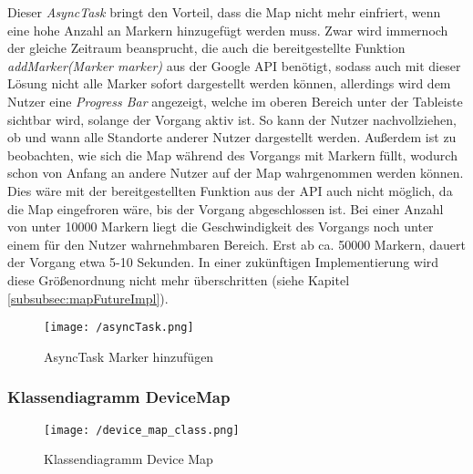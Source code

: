 Dieser \textit{AsyncTask} bringt den Vorteil, dass die Map nicht mehr einfriert, wenn eine hohe Anzahl an Markern hinzugefügt werden muss. Zwar wird immernoch der gleiche Zeitraum beansprucht, die auch die bereitgestellte Funktion \textit{addMarker(Marker marker)} aus der Google API benötigt, sodass auch mit dieser Lösung nicht alle Marker sofort dargestellt werden können, allerdings wird dem Nutzer eine \textit{Progress Bar} angezeigt, welche im oberen Bereich unter der Tableiste sichtbar wird, solange der Vorgang aktiv ist. So kann der Nutzer nachvollziehen, ob und wann alle Standorte anderer Nutzer dargestellt werden. Außerdem ist zu beobachten, wie sich die Map während des Vorgangs mit Markern füllt, wodurch schon von Anfang an andere Nutzer auf der Map wahrgenommen werden können. Dies wäre mit der bereitgestellten Funktion aus der API auch nicht möglich, da die Map eingefroren wäre, bis der Vorgang abgeschlossen ist.
Bei einer Anzahl von unter 10000 Markern liegt die Geschwindigkeit des Vorgangs noch unter einem für den Nutzer wahrnehmbaren Bereich. Erst ab ca. 50000 Markern, dauert der Vorgang etwa 5-10 Sekunden. In einer zukünftigen Implementierung wird diese Größenordnung nicht mehr überschritten (siehe Kapitel \ref{subsubsec:mapFutureImpl}).

\begin{figure}[H]
\centering
\texttt{[image: /asyncTask.png]}
\caption[User Interface: Klassendiagramm Device Map]{AsyncTask Marker hinzufügen}
\label{fig:asyncTask}
\end{figure}

\subsubsection{Klassendiagramm DeviceMap}
\begin{figure}[H]
\centering
\texttt{[image: /device\_map\_class.png]}
\caption[User Interface: Klassendiagramm Device Map]{Klassendiagramm Device Map}
\label{fig:deviceMapClass}
\end{figure}

